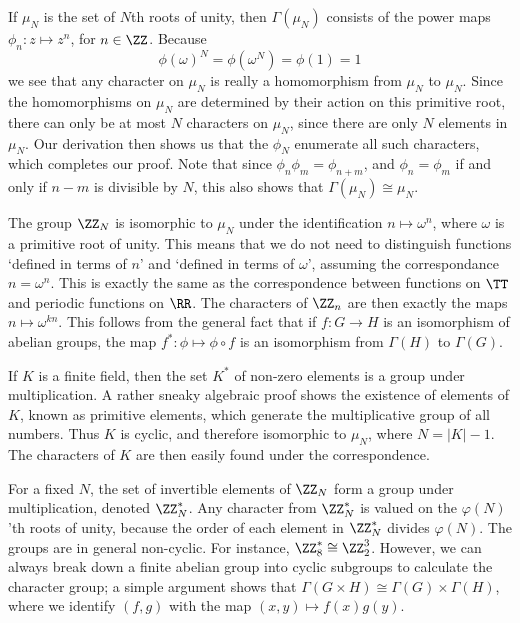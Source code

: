\begin{example}
    If $\mu_N$ is the set of $N$th roots of unity, then $\Gamma(\mu_N)$ consists of the power maps $\phi_n: z \mapsto z^n$, for $n \in \ZZ$. Because
    \[ \phi(\omega)^N = \phi(\omega^N) = \phi(1) = 1 \]
    we see that any character on $\mu_N$ is really a homomorphism from $\mu_N$ to $\mu_N$. Since the homomorphisms on $\mu_N$ are determined by their action on this primitive root, there can only be at most $N$ characters on $\mu_N$, since there are only $N$ elements in $\mu_N$. Our derivation then shows us that the $\phi_N$ enumerate all such characters, which completes our proof. Note that since $\phi_n \phi_m = \phi_{n+m}$, and $\phi_n = \phi_m$ if and only if $n - m$ is divisible by $N$, this also shows that $\Gamma(\mu_N) \cong \mu_N$.
\end{example}

\begin{example}
    The group $\ZZ_N$ is isomorphic to $\mu_N$ under the identification $n \mapsto \omega^n$, where $\omega$ is a primitive root of unity. This means that we do not need to distinguish functions `defined in terms of $n$' and `defined in terms of $\omega$', assuming the correspondance $n = \omega^n$. This is exactly the same as the correspondence between functions on $\TT$ and periodic functions on $\RR$. The characters of $\ZZ_n$ are then exactly the maps $n \mapsto \omega^{kn}$. This follows from the general fact that if $f: G \to H$ is an isomorphism of abelian groups, the map $f^*: \phi \mapsto \phi \circ f$ is an isomorphism from $\Gamma(H)$ to $\Gamma(G)$.
\end{example}

\begin{example}
    If $K$ is a finite field, then the set $K^*$ of non-zero elements is a group under multiplication. A rather sneaky algebraic proof shows the existence of elements of $K$, known as primitive elements, which generate the multiplicative group of all numbers. Thus $K$ is cyclic, and therefore isomorphic to $\mu_N$, where $N = |K| - 1$. The characters of $K$ are then easily found under the correspondence.
\end{example}

\begin{example}
    For a fixed $N$, the set of invertible elements of $\ZZ_N$ form a group under multiplication, denoted $\ZZ_N^*$. Any character from $\ZZ_N^*$ is valued on the $\varphi(N)$'th roots of unity, because the order of each element in $\ZZ_N^*$ divides $\varphi(N)$. The groups are in general non-cyclic. For instance, $\ZZ_8^* \cong \ZZ_2^3$. However, we can always break down a finite abelian group into cyclic subgroups to calculate the character group; a simple argument shows that $\Gamma(G \times H) \cong \Gamma(G) \times \Gamma(H)$, where we identify $(f,g)$ with the map $(x,y) \mapsto f(x)g(y)$.
\end{example}

